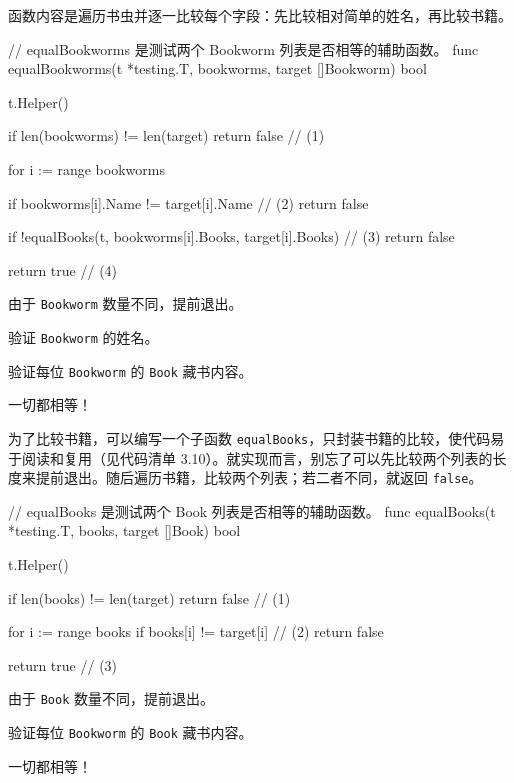 函数内容是遍历书虫并逐一比较每个字段：先比较相对简单的姓名，再比较书籍。

\begin{gocode}[title={代码清单 3.9 \texttt{bookworms\_internal\_test.go}：比较 \texttt{Bookworm}}]
// equalBookworms 是测试两个 Bookworm 列表是否相等的辅助函数。
func equalBookworms(t *testing.T, bookworms, target []Bookworm) bool {
    t.Helper()

    if len(bookworms) != len(target) {
        return false // (1)
    }

    for i := range bookworms {
        if bookworms[i].Name != target[i].Name { // (2)
            return false
        }

        if !equalBooks(t,
            bookworms[i].Books, target[i].Books) { // (3)
            return false
        }
    }

    return true // (4)
}
\end{gocode}

\begin{codeannotations}
  \item 由于 \texttt{Bookworm} 数量不同，提前退出。
  \item 验证 \texttt{Bookworm} 的姓名。
  \item 验证每位 \texttt{Bookworm} 的 \texttt{Book} 藏书内容。
  \item 一切都相等！
\end{codeannotations}

为了比较书籍，可以编写一个子函数 \texttt{equalBooks}，只封装书籍的比较，使代码易于阅读和复用（见代码清单 3.10）。就实现而言，别忘了可以先比较两个列表的长度来提前退出。随后遍历书籍，比较两个列表；若二者不同，就返回 \texttt{false}。

\begin{gocode}[title={代码清单 3.10 \texttt{bookworms\_internal\_test.go}：比较 \texttt{Book} 的辅助函数}]
// equalBooks 是测试两个 Book 列表是否相等的辅助函数。
func equalBooks(t *testing.T, books, target []Book) bool {
    t.Helper()

    if len(books) != len(target) {
        return false // (1)
    }

    for i := range books {
        if books[i] != target[i] { // (2)
            return false
        }
    }

    return true // (3)
}
\end{gocode}

\begin{codeannotations}
  \item 由于 \texttt{Book} 数量不同，提前退出。
  \item 验证每位 \texttt{Bookworm} 的 \texttt{Book} 藏书内容。
  \item 一切都相等！
\end{codeannotations}

